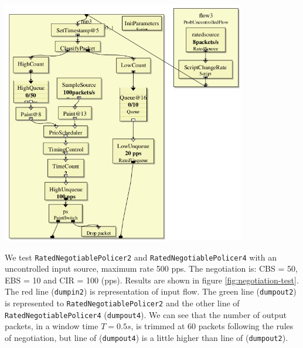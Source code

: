 \documentclass[a4paper]{article}
\begin{document}
  \begin{center}
	\includegraphics[width=0.80\textwidth]{negotiation.png}
	\label{fig:negotiation4}
  \end{center}
  We test \texttt{RatedNegotiablePolicer2} and \texttt{RatedNegotiablePolicer4} with an uncontrolled input source, maximum rate 500 pps. The negotiation is: CBS = 50, EBS = 10 and CIR = 100 (pps). Results are shown in figure \ref{fig:negotiation-test}. The red line (\texttt{dumpin2}) is representation of input flow. The green line (\texttt{dumpout2}) is represented to \texttt{RatedNegotiablePolicer2} and the other line of \texttt{RatedNegotiablePolicer4} (\texttt{dumpout4}). We can see that the number of output packets, in a window time $T = 0.5s$, is trimmed at 60 packets following the rules of negotiation, but line of (\texttt{dumpout4}) is a little higher than line of (\texttt{dumpout2}).
\end{document}
